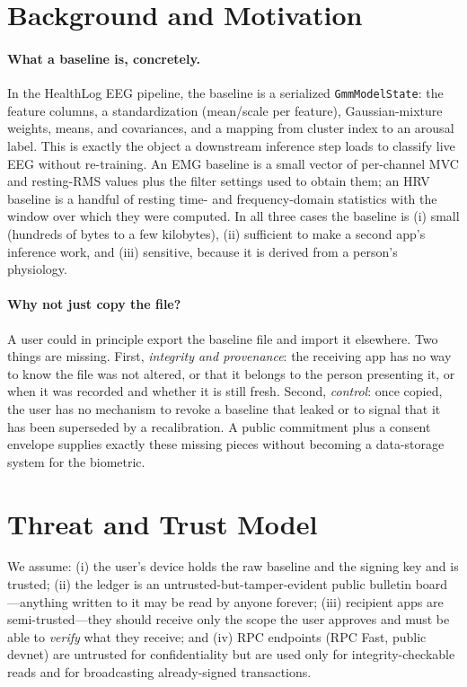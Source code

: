 \documentclass[10pt,twocolumn]{article}
\newcommand{\code}[1]{\texttt{\small #1}}
\begin{document}
\section{Background and Motivation}

\paragraph{What a baseline is, concretely.} In the HealthLog EEG pipeline, the
baseline is a serialized \code{GmmModelState}: the feature columns, a
standardization (mean/scale per feature), Gaussian-mixture weights, means, and
covariances, and a mapping from cluster index to an arousal label. This is
exactly the object a downstream inference step loads to classify live EEG
without re-training. An EMG baseline is a small vector of per-channel MVC and
resting-RMS values plus the filter settings used to obtain them; an HRV baseline
is a handful of resting time- and frequency-domain statistics with the window
over which they were computed. In all three cases the baseline is (i) small
(hundreds of bytes to a few kilobytes), (ii) sufficient to make a second app's
inference work, and (iii) sensitive, because it is derived from a person's
physiology.

\paragraph{Why not just copy the file?} A user could in principle export the
baseline file and import it elsewhere. Two things are missing. First,
\emph{integrity and provenance}: the receiving app has no way to know the file
was not altered, or that it belongs to the person presenting it, or when it was
recorded and whether it is still fresh. Second, \emph{control}: once copied, the
user has no mechanism to revoke a baseline that leaked or to signal that it has
been superseded by a recalibration. A public commitment plus a consent envelope
supplies exactly these missing pieces without becoming a data-storage system for
the biometric.

\section{Threat and Trust Model}

We assume: (i) the user's device holds the raw baseline and the signing key and
is trusted; (ii) the ledger is an untrusted-but-tamper-evident public bulletin
board---anything written to it may be read by anyone forever; (iii) recipient
apps are semi-trusted---they should receive only the scope the user approves and
must be able to \emph{verify} what they receive; and (iv) RPC endpoints (RPC
Fast, public devnet) are untrusted for confidentiality but are used only for
integrity-checkable reads and for broadcasting already-signed transactions.
\end{document}
